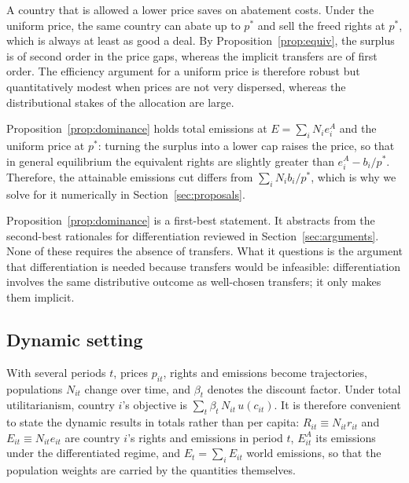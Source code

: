 \documentclass[12pt,english]{article}
\theoremstyle{remark}
\begin{document}
A country that is allowed a lower price saves on abatement costs. %
Under the uniform price, the same country can abate up to $p^*$ and sell the freed rights at $p^*$, which is always at least as good a deal. By Proposition~\ref{prop:equiv}, the surplus is of second order in the price gaps, whereas the implicit transfers are of first order. The efficiency argument for a uniform price is therefore robust but quantitatively modest when prices are not very dispersed, whereas the distributional stakes of the allocation are large. 

Proposition~\ref{prop:dominance} holds total emissions at $E=\sum_i N_i e^A_i$ and the uniform price at $p^*$: turning the surplus into a lower cap raises the price, so that in general equilibrium the equivalent rights are slightly greater than $e^A_i - b_i/p^*$. Therefore, the attainable emissions cut differs from $\sum_i N_i b_i/p^*$, which is why we solve for it numerically in Section~\ref{sec:proposals}.

Proposition~\ref{prop:dominance} is a first-best statement. It abstracts from the second-best rationales for differentiation reviewed in Section~\ref{sec:arguments}. None of these requires the absence of transfers.
What it questions is the argument that differentiation is needed because transfers would be infeasible: differentiation involves the same distributive outcome as well-chosen transfers; it only makes them implicit.

\subsection{Dynamic setting}
\label{sec:dynamic}

With several periods $t$, prices $p_{it}$, rights and emissions become trajectories, populations $N_{it}$ change over time, and $\beta_t$ denotes the discount factor. Under total utilitarianism, country $i$'s objective is $\sum_t \beta_t\,N_{it}\,u(c_{it})$. %
It is therefore convenient to state the dynamic results in totals rather than per capita: $R_{it}\equiv N_{it}r_{it}$ and $E_{it}\equiv N_{it}e_{it}$ are country $i$'s rights and emissions in period $t$, $E^A_{it}$ its emissions under the differentiated regime, and $E_t=\sum_i E_{it}$ world emissions, so that the population weights are carried by the quantities themselves.
\end{document}
